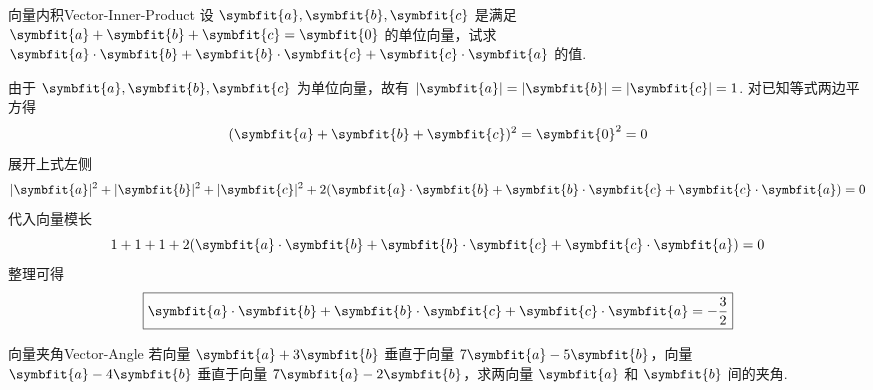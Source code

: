 \begin{problem}{向量内积}{Vector-Inner-Product}
    设 $\symbfit{a}, \symbfit{b}, \symbfit{c}$ 是满足 $\symbfit{a} + \symbfit{b} + \symbfit{c} = \symbfit{0}$ 的单位向量，试求 $\symbfit{a} \cdot \symbfit{b} + \symbfit{b} \cdot \symbfit{c} + \symbfit{c} \cdot \symbfit{a}$ 的值.
\end{problem}

\begin{solution}
    由于 $\symbfit{a}, \symbfit{b}, \symbfit{c}$ 为单位向量，故有 $|\symbfit{a}| = |\symbfit{b}| = |\symbfit{c}| = 1$. 对已知等式两边平方得
    \begin{equation}
        (\symbfit{a} + \symbfit{b} + \symbfit{c})^2 = \symbfit{0}^2 = 0
    \end{equation}
    展开上式左侧
    \begin{equation}
        |\symbfit{a}|^2 + |\symbfit{b}|^2 + |\symbfit{c}|^2 + 2(\symbfit{a} \cdot \symbfit{b} + \symbfit{b} \cdot \symbfit{c} + \symbfit{c} \cdot \symbfit{a}) = 0
    \end{equation}
    代入向量模长
    \begin{equation}
        1 + 1 + 1 + 2(\symbfit{a} \cdot \symbfit{b} + \symbfit{b} \cdot \symbfit{c} + \symbfit{c} \cdot \symbfit{a}) = 0
    \end{equation}
    整理可得
    \begin{equation}
        \boxed{\symbfit{a} \cdot \symbfit{b} + \symbfit{b} \cdot \symbfit{c} + \symbfit{c} \cdot \symbfit{a} = -\frac{3}{2}}
    \end{equation}
\end{solution}

\begin{problem}{向量夹角}{Vector-Angle}
    若向量 $\symbfit{a} + 3\symbfit{b}$ 垂直于向量 $7\symbfit{a} - 5\symbfit{b}$，向量 $\symbfit{a} - 4\symbfit{b}$ 垂直于向量 $7\symbfit{a} - 2\symbfit{b}$，求两向量 $\symbfit{a}$ 和 $\symbfit{b}$ 间的夹角.
\end{problem}

